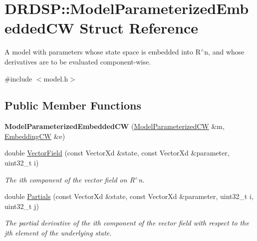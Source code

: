 \hypertarget{struct_d_r_d_s_p_1_1_model_parameterized_embedded_c_w}{\section{D\-R\-D\-S\-P\-:\-:Model\-Parameterized\-Embedded\-C\-W Struct Reference}
\label{struct_d_r_d_s_p_1_1_model_parameterized_embedded_c_w}
}


A model with parameters whose state space is embedded into R$^\wedge$n, and whose derivatives are to be evaluated component-\/wise.  




{\ttfamily \#include $<$model.\-h$>$}

\subsection*{Public Member Functions}
\begin{DoxyCompactItemize}
\item 
\hypertarget{struct_d_r_d_s_p_1_1_model_parameterized_embedded_c_w_a4744a0ef259bc046f7f06f2d49ff4756}{{\bfseries Model\-Parameterized\-Embedded\-C\-W} (\hyperlink{struct_d_r_d_s_p_1_1_model_parameterized_c_w}{Model\-Parameterized\-C\-W} \&m, \hyperlink{struct_d_r_d_s_p_1_1_embedding_c_w}{Embedding\-C\-W} \&e)}\label{struct_d_r_d_s_p_1_1_model_parameterized_embedded_c_w_a4744a0ef259bc046f7f06f2d49ff4756}

\item 
\hypertarget{struct_d_r_d_s_p_1_1_model_parameterized_embedded_c_w_a7a798d3588c97da4596db6625111201c}{double \hyperlink{struct_d_r_d_s_p_1_1_model_parameterized_embedded_c_w_a7a798d3588c97da4596db6625111201c}{Vector\-Field} (const Vector\-Xd \&state, const Vector\-Xd \&parameter, uint32\-\_\-t i)}\label{struct_d_r_d_s_p_1_1_model_parameterized_embedded_c_w_a7a798d3588c97da4596db6625111201c}

\begin{DoxyCompactList}\small\item\em The ith component of the vector field on R$^\wedge$n. \end{DoxyCompactList}\item 
\hypertarget{struct_d_r_d_s_p_1_1_model_parameterized_embedded_c_w_a9dd7e110f102eac42adcbd79877cfbd6}{double \hyperlink{struct_d_r_d_s_p_1_1_model_parameterized_embedded_c_w_a9dd7e110f102eac42adcbd79877cfbd6}{Partials} (const Vector\-Xd \&state, const Vector\-Xd \&parameter, uint32\-\_\-t i, uint32\-\_\-t j)}\label{struct_d_r_d_s_p_1_1_model_parameterized_embedded_c_w_a9dd7e110f102eac42adcbd79877cfbd6}

\begin{DoxyCompactList}\small\item\em The partial derivative of the ith component of the vector field with respect to the jth element of the underlying state. \end{DoxyCompactList}\end{DoxyCompactItemize}
